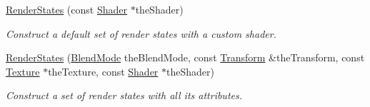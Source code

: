 \begin{DoxyCompactItemize}
\hyperlink{classsf_1_1_render_states_a39f94233f464739d8d8522f3aefe97d0}{Render\+States} (const \hyperlink{classsf_1_1_shader}{Shader} $\ast$the\+Shader)
\begin{DoxyCompactList}\small\item\em Construct a default set of render states with a custom shader. \end{DoxyCompactList}\item 
\hyperlink{classsf_1_1_render_states_ae508c91ac7b8992dc22b8d8a4027ad09}{Render\+States} (\hyperlink{group__graphics_ga80c52fe2f7050d7f7573b7ed3c995388}{Blend\+Mode} the\+Blend\+Mode, const \hyperlink{classsf_1_1_transform}{Transform} \&the\+Transform, const \hyperlink{classsf_1_1_texture}{Texture} $\ast$the\+Texture, const \hyperlink{classsf_1_1_shader}{Shader} $\ast$the\+Shader)
\begin{DoxyCompactList}\small\item\em Construct a set of render states with all its attributes. \end{DoxyCompactList}\end{DoxyCompactItemize}
